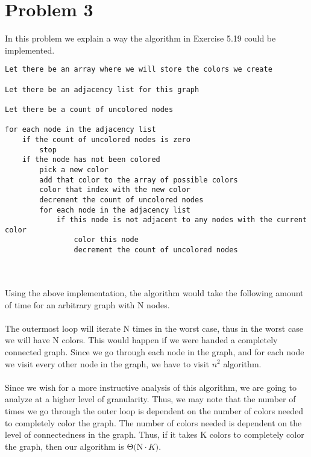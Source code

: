 \section*{Problem 3}

In this problem we explain a way the algorithm in Exercise 5.19 could be implemented.

{\noindent \hrulefill}
\begin{lstlisting}
Let there be an array where we will store the colors we create

Let there be an adjacency list for this graph

Let there be a count of uncolored nodes

for each node in the adjacency list
    if the count of uncolored nodes is zero
        stop
    if the node has not been colored
        pick a new color
        add that color to the array of possible colors
        color that index with the new color
        decrement the count of uncolored nodes
        for each node in the adjacency list
            if this node is not adjacent to any nodes with the current color 
                color this node
                decrement the count of uncolored nodes

\end{lstlisting}
\hrulefill
\\
\\
Using the above implementation, the algorithm would take the following amount of time for an arbitrary graph with N nodes.
\\
\\
The outermost loop will iterate N times in the worst case, thus in the worst case we will have N colors. This would happen if we were handed a completely connected graph. Since we go through each node in the graph, and for each node we visit every other node in the graph, we have to visit $n^2$ algorithm.  
\\
\\
Since we wish for a more instructive analysis of this algorithm, we are going to analyze at a higher level of granularity. Thus, we may note that the number of times we go through the outer loop is dependent on the number of colors needed to completely color the graph. The number of colors needed is dependent on the level of connectedness in the graph. Thus, if it takes K colors to completely color the graph, then our algorithm is  $\mathrm{\Theta (N}\cdot K \mathrm{)}$. 
